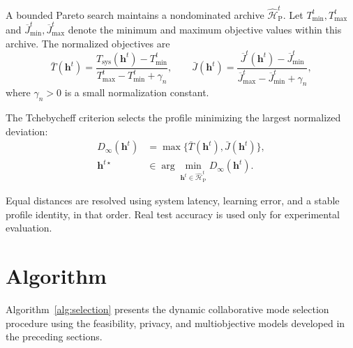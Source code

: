 \documentclass[5p,times]{elsarticle}
\theoremstyle{plain}
\theoremstyle{definition}
\theoremstyle{remark}
\begin{document}
A bounded Pareto search maintains a
nondominated archive
\(\widehat{\mathcal H}_{\mathrm P}^t\).
Let \(T_{\min}^t,T_{\max}^t\) and
\(\overline J_{\min}^t,\overline J_{\max}^t\)
denote the minimum and maximum objective values
within this archive.
The normalized objectives are
\begin{equation}
\bar T(\mathbf h^t)
=
\frac{
T_{\mathrm{sys}}(\mathbf h^t)-T_{\min}^t
}{
T_{\max}^t-T_{\min}^t+\gamma_n
},
\qquad
\bar J(\mathbf h^t)
=
\frac{
\overline J^t(\mathbf h^t)-\overline J_{\min}^t
}{
\overline J_{\max}^t-\overline J_{\min}^t+\gamma_n
},
\label{eq:pareto_normalization}
\end{equation}
where \(\gamma_n>0\) is a small
normalization constant.

The Tchebycheff criterion selects the
profile minimizing the largest normalized
deviation:
\begin{equation}
\begin{aligned}
D_\infty(\mathbf h^t)
&=
\max\{
\bar T(\mathbf h^t),
\bar J(\mathbf h^t)
\},\\
\mathbf h^{t\star}
&\in
\arg\min_{
\mathbf h^t\in\widehat{\mathcal H}_{\mathrm P}^t
}
D_\infty(\mathbf h^t).
\end{aligned}
\label{eq:selection}
\end{equation}

Equal distances are resolved using
system latency, learning error, and
a stable profile identity, in that order.
Real test accuracy is used only for
experimental evaluation.



\section{Algorithm}
\label{sec:algorithm}

Algorithm~\ref{alg:selection} presents the dynamic collaborative
mode selection procedure using the feasibility, privacy, and
multiobjective models developed in the preceding sections.
\end{document}
